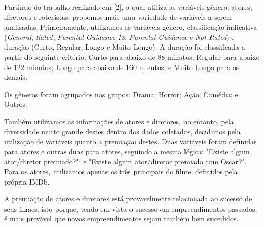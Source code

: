 \documentclass[twoside]{article}
\begin{document}
\begin{multicols}{2}
Partindo do trabalho realizado em [2], o qual utiliza as variáveis gênero, atores, diretores e roteristas, propomos mais uma variedade de variáveis a serem analisadas. Primeiramente, utilizamos as variáveis gênero, classificação indicativa (\textit{General}, \textit{Rated}, \textit{Parental Guidance 13}, \textit{Parental Guidance} e \textit{Not Rated}) e duração (Curto, Regular, Longo e Muito Longo). A duração foi classificada a partir do seguinte critério: Curto para abaixo de 88 minutos; Regular para abaixo de 122 minutos; Longo para abaixo de 160 minutos; e Muito Longo para os demais.

Os gêneros foram agrupados nos grupos: Drama; Horror; Ação; Comédia; e Outros.

Também utilizamos as informações de atores e diretores, no entanto, pela diversidade muito grande destes dentro dos dados coletados, decidimos pela utilização de variáveis quanto a premiação destes. Duas variáveis foram definidas para atores e outras duas para atores, seguindo a mesma lógica: "Existe algum ator/diretor premiado?"; e "Existe algum ator/diretor premiado com Oscar?". Para os atores, utilizamos apenas os três principais do filme, definidos pela própria IMDb.

A premiação de atores e diretores está provavelmente relacionada ao sucesso de seus filmes, isto porque, tendo em vista o sucesso em empreendimentos passados, é mais provável que novos empreendimentos sejam também bem sucedidos.


\end{multicols}
\end{document}

